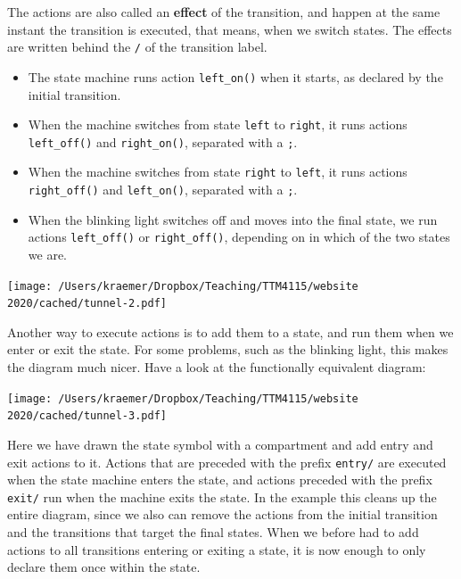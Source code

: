 \documentclass[10pt, twoside, twocolumn]{book}
\providecommand{\tightlist}{%
  \setlength{\itemsep}{0pt}\setlength{\parskip}{0pt}}
\let\origfigure=\figure
\let\endorigfigure=\endfigure
\renewenvironment{figure}[1][]{%
  \origfigure[H]
}{%
  \endorigfigure
}
\begin{document}
The actions are also called an \textbf{effect} of the transition, and
happen at the same instant the transition is executed, that means, when
we switch states. The effects are written behind the \texttt{/} of the
transition label.

\begin{itemize}
\tightlist
\item
  The state machine runs action \texttt{left\_on()} when it starts, as
  declared by the initial transition.
\item
  When the machine switches from state \texttt{left} to \texttt{right},
  it runs actions \texttt{left\_off()} and \texttt{right\_on()},
  separated with a \texttt{;}.
\item
  When the machine switches from state \texttt{right} to \texttt{left},
  it runs actions \texttt{right\_off()} and \texttt{left\_on()},
  separated with a \texttt{;}.
\item
  When the blinking light switches off and moves into the final state,
  we run actions \texttt{left\_off()} or \texttt{right\_off()},
  depending on in which of the two states we are.
\end{itemize}

\begin{figure}[htbp]
\begin{center}
\texttt{[image: /Users/kraemer/Dropbox/Teaching/TTM4115/website 2020/cached/tunnel-2.pdf]}%
\label{default}
\end{center}
\end{figure}
Another way to execute actions is to add them to a state, and run them
when we enter or exit the state. For some problems, such as the blinking
light, this makes the diagram much nicer. Have a look at the
functionally equivalent diagram:

\begin{figure}[htbp]
\begin{center}
\texttt{[image: /Users/kraemer/Dropbox/Teaching/TTM4115/website 2020/cached/tunnel-3.pdf]}%
\label{default}
\end{center}
\end{figure}
Here we have drawn the state symbol with a compartment and add entry and
exit actions to it. Actions that are preceded with the prefix
\texttt{entry/} are executed when the state machine enters the state,
and actions preceded with the prefix \texttt{exit/} run when the machine
exits the state. In the example this cleans up the entire diagram, since
we also can remove the actions from the initial transition and the
transitions that target the final states. When we before had to add
actions to all transitions entering or exiting a state, it is now enough
to only declare them once within the state.
\end{document}
